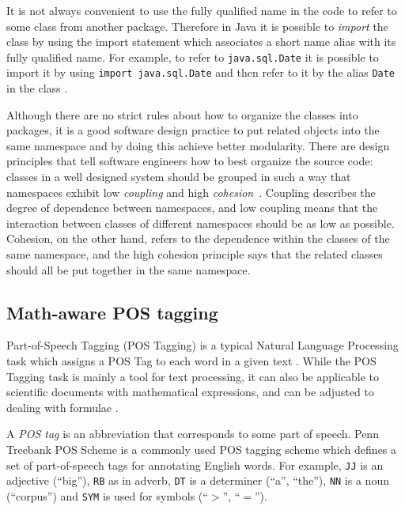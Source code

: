 It is not always convenient to use the fully qualified name in the code to
refer to some class from another package. Therefore in Java it is possible to
\emph{import} the class by using the import statement which associates
a short name alias with its fully qualified name.
For example, to refer to \texttt{java.sql.Date} it is possible to import
it by using \texttt{import java.sql.Date} and then refer to it by the alias
\texttt{Date} in the class \cite{gosling2014java}.


Although there are no strict rules about how to organize the classes into
packages, it is a good software design practice to put
related objects into the same namespace and by doing this achieve
better modularity. There are design principles that tell software engineers
how to best organize the source code: classes in a well designed system
should be grouped in such a way that namespaces
exhibit low \emph{coupling} and high \emph{cohesion}~\cite{larman2005applying}.
Coupling describes the degree of dependence between namespaces, and
low coupling means that the interaction between classes of different
namespaces should be as low as possible. Cohesion, on the other hand,
refers to the dependence within the classes of the same namespace,
and the high cohesion principle says that the related classes
should all be put together in the same namespace.



\subsection{Math-aware POS tagging} \label{sec:postagging}
Part-of-Speech Tagging (POS Tagging) is a typical Natural Language Processing
task which assigns a POS Tag to each word in a given text \cite{jurafsky2000speech}.
While the POS Tagging task is mainly a tool for text processing, it can
also be applicable to scientific documents with mathematical expressions,
and can be adjusted to dealing with formulae \cite{schoneberg2014pos}
\cite{pagael2014mlp}.

A \emph{POS tag} is an abbreviation that corresponds to some
part of speech. Penn Treebank POS Scheme \cite{santorini1990part} is
a commonly used POS tagging scheme which defines a set of part-of-speech tags
for annotating English words.
For example, \texttt{JJ} is an adjective (``big''), \texttt{RB} as in adverb,
\texttt{DT} is a determiner (``a'', ``the''), \texttt{NN} is a
noun (``corpus'') and \texttt{SYM} is used for symbols (``$>$'', ``$=$'').


